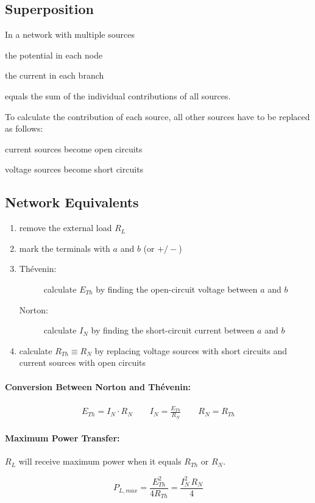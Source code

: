 
\subsection{Superposition} %
	
	In a network with multiple sources
	\begin{tightitemize}
		\item the potential in each node
		\item the current in each branch
	\end{tightitemize}
	equals the sum of the individual contributions of all sources.
	
	To calculate the contribution of each source, all other sources have to be replaced as follows:
	\begin{tightitemize}
		\item current sources become open circuits
		\item voltage sources become short circuits
	\end{tightitemize}
	

\subsection{Network Equivalents} %
	
	
	\begin{enumerate}
		\item remove the external load $R_L$
		\item mark the terminals with $a$ and $b$ (or $+/-$)
		\item 
			\begin{description}
				\item[Thévenin:] calculate $E_{Th}$ by finding the open-circuit voltage between $a$ and $b$
				\item[Norton:] calculate $I_N$ by finding the short-circuit current between $a$ and $b$
			\end{description}
		\item calculate $R_{Th} \equiv R_N$ by replacing voltage sources with short circuits and current sources with open circuits
	\end{enumerate}
	
	\paragraph{Conversion Between Norton and Thévenin:} %
		\begin{gather*}
			E_{Th} = I_N \cdot R_N \qquad
			I_N = \frac{E_{Th}}{R_N} \qquad R_N = R_{Th}
		\end{gather*}
	
	\paragraph{Maximum Power Transfer:} %
		$R_L$ will receive maximum power when it equals $R_{Th}$ or $R_N$.

		\[
			P_{L,max} = \frac{E_{Th}^2}{4 R_{Th}} = \frac{I_N^2 \, R_N}{4}
		\]
	
